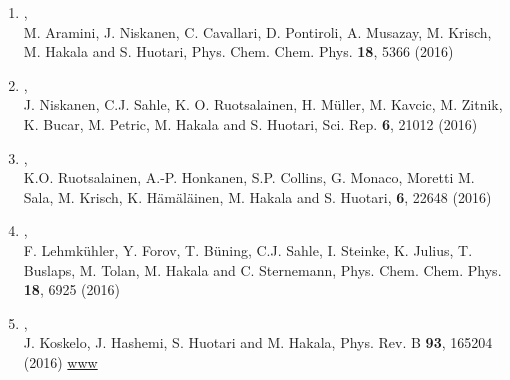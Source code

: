 \documentclass[12pt,a4]{report}
\begin{document}
\begin{enumerate}

\item{},\\
M. Aramini, J. Niskanen, C. Cavallari, D. Pontiroli, A. Musazay, M. Krisch, M. Hakala and S. Huotari, Phys. Chem. Chem. Phys. {\bf 18}, 5366 (2016)

\item{},\\
J. Niskanen, C.J. Sahle, K. O. Ruotsalainen, H. M{\"u}ller, M. Kavcic, M. Zitnik, K. Bucar, M. Petric, M. Hakala and S. Huotari, Sci. Rep. {\bf 6}, 21012 (2016)

\item{},\\
K.O. Ruotsalainen, A.-P. Honkanen, S.P. Collins, G. Monaco, Moretti M. Sala, M. Krisch, K. H{\"a}m{\"a}l{\"a}inen, M. Hakala and S. Huotari, {\bf 6}, 22648 (2016)

\item{},\\
F. Lehmk{\"u}hler, Y. Forov, T. Büning, C.J. Sahle, I. Steinke, K. Julius, T. Buslaps, M. Tolan, M. Hakala and C. Sternemann, Phys. Chem. Chem. Phys. {\bf 18}, 6925 (2016)

\item{},\\
J. Koskelo, J. Hashemi, S. Huotari and M. Hakala, Phys. Rev. B {\bf 93}, 165204 (2016)
\href{http://journals.aps.org/prb/abstract/10.1103/PhysRevB.93.165204}{www}



\end{enumerate}
\end{document}
